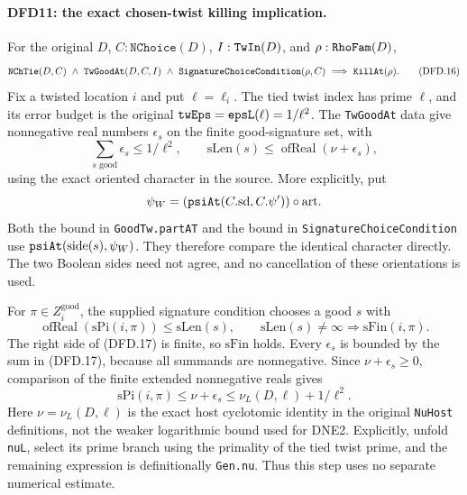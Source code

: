 \paragraph{DFD11: the exact chosen-twist killing implication.}
\label{claim:DFD11}
For the original $D$, $C:\texttt{NChoice}(D)$,
$I:\texttt{Tw\allowbreak In}(D)$, and $\rho:\texttt{Rho\allowbreak Fam}(D)$,
\[
 \texttt{NCh\allowbreak Tie}(D,C)\ \wedge\ \texttt{Tw\allowbreak Good\allowbreak At}(D,C,I)
 \ \wedge\ \texttt{Signature\allowbreak Choice\allowbreak Condition}(\rho,C)
       \ \Longrightarrow\ \texttt{Kill\allowbreak At}(\rho).        \tag{DFD.16}
\]
Fix a twisted location $i$ and put $\ell=\ell_i$.
The tied twist index has prime $\ell$, and its error budget
is the original $\texttt{tw\allowbreak Eps}=\texttt{eps\allowbreak L}(\ell)=1/\ell^2$.
The \texttt{Tw\allowbreak Good\allowbreak At} data give nonnegative real numbers
$\epsilon_s$ on the finite good-signature set, with
\[
 \sum_{s\text{ good}}\epsilon_s\le1/\ell^2,
 \qquad
 \mathrm{sLen}(s)\le
          \operatorname{ofReal}(\nu+\epsilon_s),         \tag{DFD.17}
\]
using the exact oriented character in the source. More
explicitly, put
\[
 \psi_W=(\texttt{psi\allowbreak At}(C.\mathrm{sd},C.\psi'))
                       \circ\mathrm{art}.
\]
Both the bound in \texttt{GoodTw.partAT} and the bound in
\texttt{SignatureChoiceCondition} use
$\texttt{psi\allowbreak At}(\mathrm{side}(s),\psi_W)$.
They therefore compare the identical character directly.
The two Boolean sides need not agree, and no cancellation
of these orientations is used.

For $\pi\in Z_i^{\mathrm{good}}$, the supplied signature
condition chooses a good $s$ with
\[
 \operatorname{ofReal}(\mathrm{sPi}(i,\pi))
    \le\mathrm{sLen}(s),
 \qquad\mathrm{sLen}(s)\ne\infty
                \Longrightarrow\mathrm{sFin}(i,\pi).
\]
The right side of (DFD.17) is finite, so $\mathrm{sFin}$
holds. Every $\epsilon_s$ is bounded by the sum in
(DFD.17), because all summands are nonnegative. Since
$\nu+\epsilon_s\ge0$, comparison of the finite extended
nonnegative reals gives
\[
       \mathrm{sPi}(i,\pi)
          \le\nu+\epsilon_s\le\nu_L(D,\ell)+1/\ell^2.     \tag{DFD.18}
\]
Here $\nu=\nu_L(D,\ell)$ is the exact host cyclotomic
identity in the original \texttt{Nu\allowbreak Host} definitions, not
the weaker logarithmic bound used for DNE2. Explicitly,
unfold \texttt{nu\allowbreak L}, select its prime branch using the
primality of the tied twist prime, and the remaining
expression is definitionally \texttt{Gen.nu}. Thus this
step uses no separate numerical estimate.

